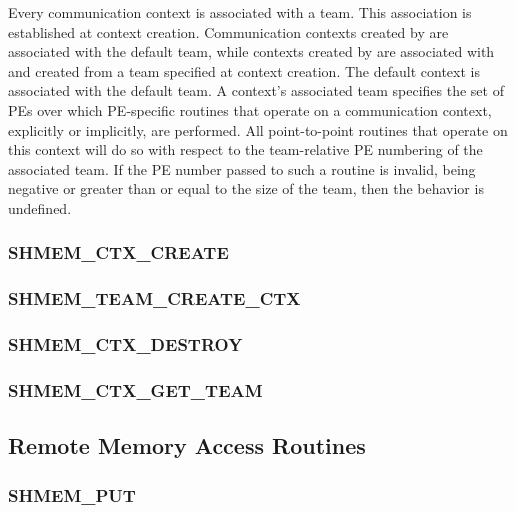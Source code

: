\documentclass[10pt]{book}
\begin{document}
Every communication context is associated with a team.
This association is established at context creation.
Communication contexts created by  are
associated with the default team, while contexts created by
 are associated with and created from a team
specified at context creation.
The default context is associated with the default team.
A context's associated team specifies the set of \acp{PE} over which
\ac{PE}-specific routines that operate on a communication context,
explicitly or implicitly, are performed.
All point-to-point routines that operate on this context will do so with
respect to the team-relative \ac{PE} numbering of the associated team.
If the PE number passed to such a routine is invalid, being negative or greater
than or equal to the size of the \openshmem team, then the behavior is undefined.

\subsubsection{\textbf{SHMEM\_CTX\_CREATE}}
\label{subsec:shmem_ctx_create}


\subsubsection{\textbf{SHMEM\_TEAM\_CREATE\_CTX}}
\label{subsec:shmem_team_create_ctx}


\subsubsection{\textbf{SHMEM\_CTX\_DESTROY}}
\label{subsec:shmem_ctx_destroy}


\subsubsection{\textbf{SHMEM\_CTX\_GET\_TEAM}}
\label{subsec:shmem_ctx_get_team}



\subsection{Remote Memory Access Routines}\label{sec:rma}


\subsubsection{\textbf{SHMEM\_PUT}}\label{subsec:shmem_put}

\end{document}
